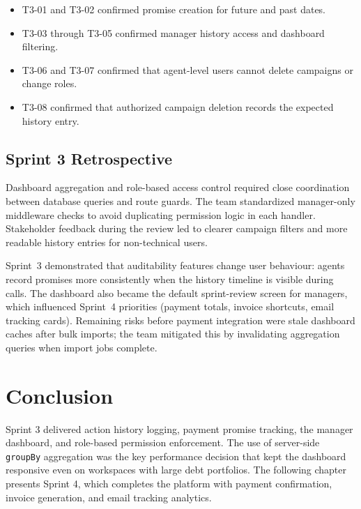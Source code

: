 ﻿\documentclass[12pt,a4paper]{report}
\begin{document}
\begin{itemize}
  \item T3-01 and T3-02 confirmed promise creation for future and past dates.
  \item T3-03 through T3-05 confirmed manager history access and dashboard filtering.
  \item T3-06 and T3-07 confirmed that agent-level users cannot delete campaigns or change roles.
  \item T3-08 confirmed that authorized campaign deletion records the expected history entry.
\end{itemize}

\subsection{Sprint 3 Retrospective}

Dashboard aggregation and role-based access control required close coordination between
database queries and route guards.
The team standardized manager-only middleware checks to avoid duplicating permission logic in
each handler.
Stakeholder feedback during the review led to clearer campaign filters and more readable
history entries for non-technical users.

Sprint~3 demonstrated that auditability features change user behaviour: agents record promises
more consistently when the history timeline is visible during calls.
The dashboard also became the default sprint-review screen for managers, which influenced
Sprint~4 priorities (payment totals, invoice shortcuts, email tracking cards).
Remaining risks before payment integration were stale dashboard caches after bulk imports;
the team mitigated this by invalidating aggregation queries when import jobs complete.

\section*{Conclusion}
{}

Sprint 3 delivered action history logging, payment promise tracking, the manager
dashboard, and role-based permission enforcement.
The use of server-side \texttt{groupBy} aggregation was the key performance decision
that kept the dashboard responsive even on workspaces with large debt portfolios.
The following chapter presents Sprint 4, which completes the platform with payment
confirmation, invoice generation, and email tracking analytics.
\end{document}
